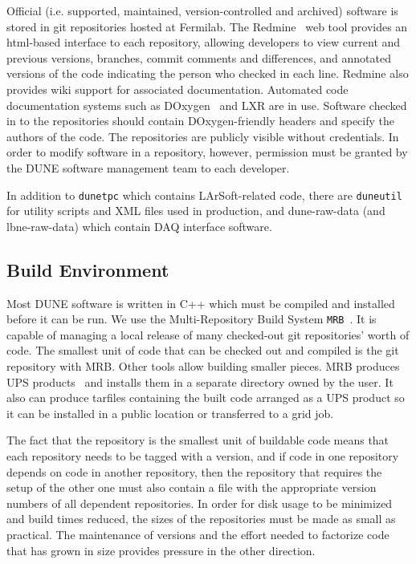 Official (i.e. supported, maintained, version-controlled and archived) software is stored in git repositories
hosted at Fermilab.  The Redmine~\cite{redmine} web tool provides an html-based interface to each repository,
allowing developers to view current and previous versions, branches, commit comments and differences, and
annotated versions of the code indicating the person who checked in each line.  Redmine also provides wiki
support for associated documentation.  Automated code documentation systems such as DOxygen~\cite{DOxygen}
and LXR are in use.  Software checked in to the repositories should contain DOxygen-friendly headers and
specify the authors of the code.  The repositories are publicly visible without credentials.  In order to
modify software in a repository, however, permission must be granted by the DUNE software management team
to each developer.

In addition to {\tt dunetpc} which contains LArSoft-related code, there are {\tt duneutil} for utility scripts
and XML files used in production, and dune-raw-data (and lbne-raw-data) which contain DAQ interface software.

\subsection{Build Environment}

Most DUNE software is written in C++ which must be compiled and installed before it can be run.  We use the
Multi-Repository Build System {\tt MRB}~\cite{mrb}.  It is capable of managing a local release of many checked-out
git repositories' worth of code.  The smallest unit of code that can be checked out and compiled is the git
repository with MRB.  Other tools allow building smaller pieces.  MRB produces UPS products~\cite{ups} 
and installs them in a separate directory owned by the user.  It also can produce tarfiles containing
the built code arranged as a UPS product so it can be installed in a public location or transferred to a grid job.

The fact that the repository is the smallest unit of buildable code means that each repository needs to be
tagged with a version, and if code in one repository depends on code in another repository, then the
repository that requires the setup of the other one must also contain a file with the appropriate version numbers
of all dependent repositories.  In order for disk usage to be minimized and build times reduced, the sizes 
of the repositories must be made as small as practical.  The maintenance of versions and the effort
needed to factorize code that has grown in size provides pressure in the other direction.

